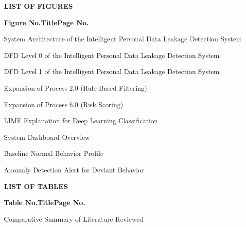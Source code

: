 ﻿\documentclass[12pt,oneside]{report}
\begin{document}
\thispagestyle{empty}
\setcounter{page}{6}
\setcounter{page}{6}

\begin{center}
\textbf{\Large LIST OF FIGURES}
\end{center}
\vspace{1cm}
\noindent\textbf{Figure No.}\hfill\textbf{Title}\hfill\textbf{Page No.}\par
\vspace{0.5cm}

\hspace{1cm} System Architecture of the Intelligent Personal Data Leakage Detection System \par
\vspace{0.2cm}
\hspace{1cm} DFD Level 0 of the Intelligent Personal Data Leakage Detection System \par
\vspace{0.2cm}
\hspace{1cm} DFD Level 1 of the Intelligent Personal Data Leakage Detection System \par
\vspace{0.2cm}
\hspace{1cm} Expansion of Process 2.0 (Rule-Based Filtering) \par
\vspace{0.2cm}
\hspace{1cm} Expansion of Process 6.0 (Risk Scoring) \par
\vspace{0.2cm}
\hspace{1cm} LIME Explanation for Deep Learning Classification \par
\vspace{0.2cm}
\hspace{1cm} System Dashboard Overview \par
\vspace{0.2cm}
\hspace{1cm} Baseline Normal Behavior Profile \par
\vspace{0.2cm}
\hspace{1cm} Anomaly Detection Alert for Deviant Behavior \par

\newpage
\thispagestyle{empty}
\begin{center}
\textbf{\Large LIST OF TABLES}
\end{center}
\vspace{1cm}
\noindent\textbf{Table No.}\hfill\textbf{Title}\hfill\textbf{Page No.}\par
\vspace{0.5cm}
\hspace{1cm} Comparative Summary of Literature Reviewed \par
\end{document}
